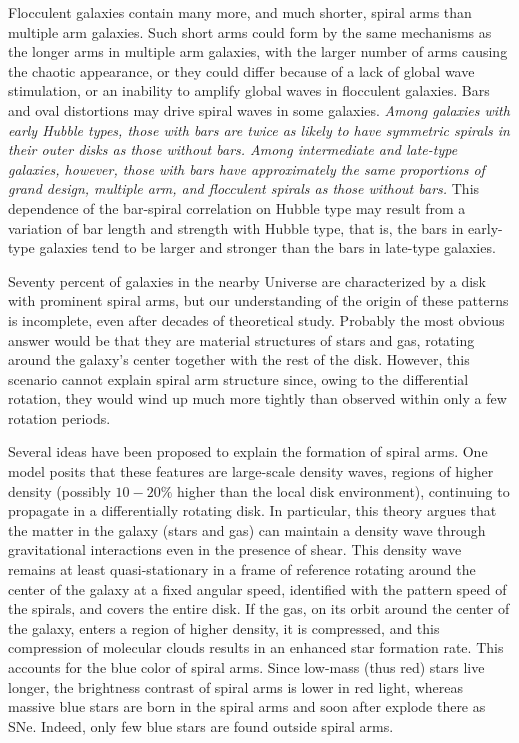 \documentclass[a4paper,10pt]{article}
\begin{document}
{\noindent}Flocculent galaxies contain many more, and much shorter, spiral arms than multiple arm galaxies. Such short arms could form by the same mechanisms as the longer arms in multiple arm galaxies, with the larger number of arms causing the chaotic appearance, or they could differ because of a lack of global wave stimulation, or an inability to amplify global waves in flocculent galaxies. Bars and oval distortions may drive spiral waves in some galaxies. \textit{Among galaxies with early Hubble types, those with bars are twice as likely to have symmetric spirals in their outer disks as those without bars. Among intermediate and late-type galaxies, however, those with bars have approximately the same proportions of grand design, multiple arm, and flocculent spirals as those without bars.} This dependence of the bar-spiral correlation on Hubble type may result from a variation of bar length and strength with Hubble type, that is, the bars in early-type galaxies tend to be larger and stronger than the bars in late-type galaxies.

{\noindent}Seventy percent of galaxies in the nearby Universe are characterized by a disk with prominent spiral arms, but our understanding of the origin of these patterns is incomplete, even after decades of theoretical study. Probably the most obvious answer would be that they are material structures of stars and gas, rotating around the galaxy's center together with the rest of the disk. However, this scenario cannot explain spiral arm structure since, owing to the differential rotation, they would wind up much more tightly than observed within only a few rotation periods. 

{\noindent}Several ideas have been proposed to explain the formation of spiral arms. One model posits that these features are large-scale density waves, regions of higher density (possibly $10-20\%$ higher than the local disk environment), continuing to propagate in a differentially rotating disk. In particular, this theory argues that the matter in the galaxy (stars and gas) can maintain a density wave through gravitational interactions even in the presence of shear.  This density wave remains at least quasi-stationary in a frame of reference rotating around the center of the galaxy at a fixed angular speed, identified with the pattern speed of the spirals, and covers the entire disk. If the gas, on its orbit around the center of the galaxy, enters a region of higher density, it is compressed, and this compression of molecular clouds results in an enhanced star formation rate. This accounts for the blue color of spiral arms. Since low-mass (thus red) stars live longer, the brightness contrast of spiral arms is lower in red light, whereas massive blue stars are born in the spiral arms and soon after explode there as SNe. Indeed, only few blue stars are found outside spiral arms.
\end{document}
